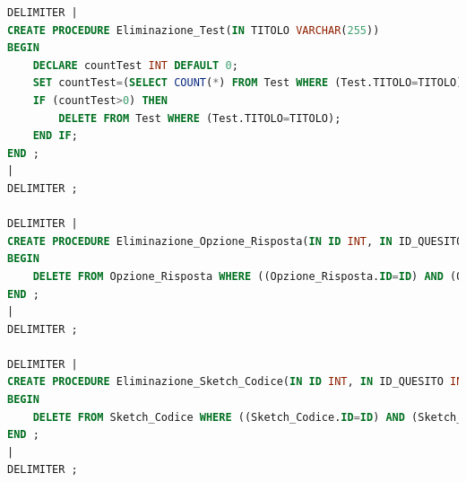 \documentclass{article}
\begin{document}
\begin{lstlisting}[language=SQL, title=Codice SQL completo delle stored procedure dello schema della basi di dati.]
DELIMITER |
CREATE PROCEDURE Eliminazione_Test(IN TITOLO VARCHAR(255))
BEGIN
	DECLARE countTest INT DEFAULT 0;
	SET countTest=(SELECT COUNT(*) FROM Test WHERE (Test.TITOLO=TITOLO));
	IF (countTest>0) THEN
		DELETE FROM Test WHERE (Test.TITOLO=TITOLO);
	END IF;
END ;
| 
DELIMITER ;

DELIMITER |
CREATE PROCEDURE Eliminazione_Opzione_Risposta(IN ID INT, IN ID_QUESITO INT, IN TITOLO_TEST VARCHAR(255))
BEGIN
	DELETE FROM Opzione_Risposta WHERE ((Opzione_Risposta.ID=ID) AND (Opzione_Risposta.ID_DOMANDA_CHIUSA=ID_QUESITO) AND (Opzione_Risposta.TITOLO_TEST=TITOLO_TEST));
END ;
| 
DELIMITER ;

DELIMITER |
CREATE PROCEDURE Eliminazione_Sketch_Codice(IN ID INT, IN ID_QUESITO INT, IN TITOLO_TEST VARCHAR(255))
BEGIN
	DELETE FROM Sketch_Codice WHERE ((Sketch_Codice.ID=ID) AND (Sketch_Codice.ID_DOMANDA_CODICE=ID_QUESITO) AND (Sketch_Codice.TITOLO_TEST=TITOLO_TEST));
END ;
| 
DELIMITER ;
\end{lstlisting}
\end{document}
